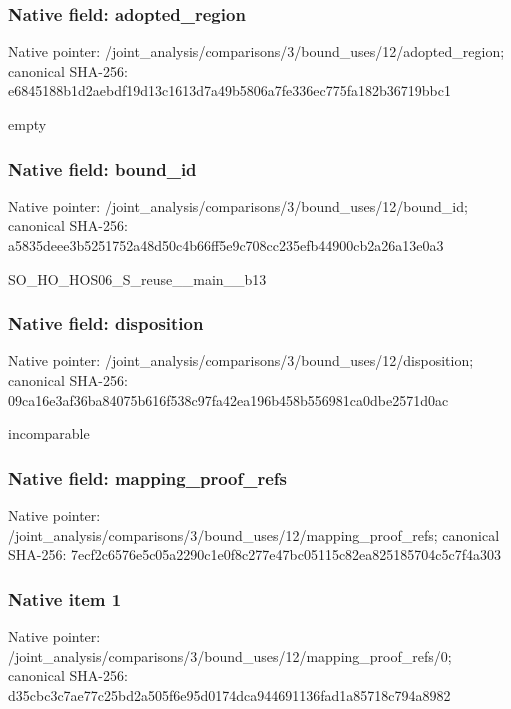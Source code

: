 \documentclass[10pt,a4paper]{article}
\begin{document}
\subsubsection{Native field: adopted\_\allowbreak{}region}
Native pointer: /joint\_\allowbreak{}analysis/comparisons/3/bound\_\allowbreak{}uses/12/adopted\_\allowbreak{}region; canonical SHA-256: e6845188b1d2aebdf19d13c1613d7a49b5806a7fe336ec775fa182b36719bbc1

\begingroup\raggedright\sloppy empty\par\endgroup

\subsubsection{Native field: bound\_\allowbreak{}id}
Native pointer: /joint\_\allowbreak{}analysis/comparisons/3/bound\_\allowbreak{}uses/12/bound\_\allowbreak{}id; canonical SHA-256: a5835deee3b5251752a48d50c4b66ff5e9c708cc235efb44900cb2a26a13e0a3

\begingroup\raggedright\sloppy SO\_\allowbreak{}HO\_\allowbreak{}HOS06\_\allowbreak{}S\_\allowbreak{}reuse\_\allowbreak{}\_\allowbreak{}main\_\allowbreak{}\_\allowbreak{}b13\par\endgroup

\subsubsection{Native field: disposition}
Native pointer: /joint\_\allowbreak{}analysis/comparisons/3/bound\_\allowbreak{}uses/12/disposition; canonical SHA-256: 09ca16e3af36ba84075b616f538c97fa42ea196b458b556981ca0dbe2571d0ac

\begingroup\raggedright\sloppy incomparable\par\endgroup

\subsubsection{Native field: mapping\_\allowbreak{}proof\_\allowbreak{}refs}
Native pointer: /joint\_\allowbreak{}analysis/comparisons/3/bound\_\allowbreak{}uses/12/mapping\_\allowbreak{}proof\_\allowbreak{}refs; canonical SHA-256: 7ecf2c6576e5c05a2290c1e0f8c277e47bc05115c82ea825185704c5c7f4a303

\subsubsection{Native item 1}
Native pointer: /joint\_\allowbreak{}analysis/comparisons/3/bound\_\allowbreak{}uses/12/mapping\_\allowbreak{}proof\_\allowbreak{}refs/0; canonical SHA-256: d35cbc3c7ae77c25bd2a505f6e95d0174dca944691136fad1a85718c794a8982
\end{document}

